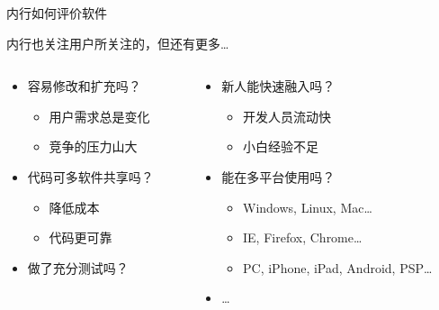 \documentclass[]{beamer}
\begin{document}
\begin{frame}{内行如何评价软件}
  \begin{block}{}
    内行也关注用户所关注的，但还有更多\dots
  \end{block}
  \begin{columns}[t]
    \begin{column}{6.1cm}
      \begin{itemize}
        \pause
        \item 容易修改和扩充吗？\structure{[扩展性]}
          \begin{itemize}
            \item 用户需求总是变化
            \item 竞争的压力山大
          \end{itemize}
        \pause
        \item 代码可多软件共享吗？\structure{[复用性]}
          \begin{itemize}
            \item 降低成本
            \item 代码更可靠
          \end{itemize}
        \pause
        \item 做了充分测试吗？\structure{[可测性]}
        \pause
      \end{itemize}
    \end{column}
    \begin{column}{6.1cm}
      \begin{itemize}
        \item 新人能快速融入吗？\structure{[可维护]}
          \begin{itemize}
            \item 开发人员流动快
            \item 小白经验不足
          \end{itemize}
        \pause
        \item 能在多平台使用吗？\structure{[可移植性]}
          \begin{itemize}
            \pause
            \item Windows, Linux, Mac\dots
            \pause
            \item IE, Firefox, Chrome\dots
            \pause
            \item PC, iPhone, iPad, Android, PSP\dots
          \end{itemize}
        \pause
        \item \dots
      \end{itemize}
    \end{column}
  \end{columns}
\end{frame}
\end{document}
